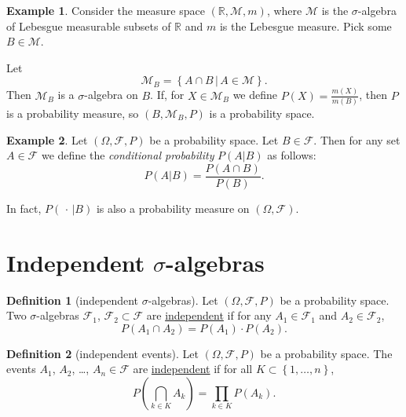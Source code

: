 \documentclass[a4paper]{scrartcl}
\newcommand{\R}{\mathbb{R}}
\newcommand{\defn}[1]{\ul{#1}}
\theoremstyle{definition}
\newtheorem{definition}{Definition}[section]
\newtheorem{example}{Example}[section]
\theoremstyle{plain}
\theoremstyle{remark}
\begin{document}
\begin{example}
  Consider the measure space $(\R, \mathcal{M}, m)$, where $\mathcal{M}$ is the $\sigma$-algebra of Lebesgue measurable subsets of $\R$ and $m$ is the Lebesgue measure. Pick some $B \in \mathcal{M}$.

  Let
  \begin{equation*}
    \mathcal{M}_{B} = \left\{ A \cap B\,\big|\, A \in \mathcal{M} \right\}.
  \end{equation*}
  Then $\mathcal{M}_{B}$ is a $\sigma$-algebra on $B$. If, for $X \in \mathcal{M}_{B}$ we define $P(X) = \frac{m(X)}{m(B)}$, then $P$ is a probability measure, so $(B, \mathcal{M}_{B}, P)$ is a probability space.
\end{example}

\begin{example}
  Let $(\Omega, \mathcal{F}, P)$ be a probability space. Let $B \in \mathcal{F}$. Then for any set $A \in \mathcal{F}$ we define the \emph{conditional probability} $P(A | B)$ as follows:
  \begin{equation*}
    P(A | B) = \frac{P(A \cap B)}{P(B)}.
  \end{equation*}

  In fact, $P(\,\cdot\,|B)$ is also a probability measure on $(\Omega, \mathcal{F})$.
\end{example}

\section{Independent \texorpdfstring{$\sigma$}{Lg}-algebras}

\begin{definition}[independent $\sigma$-algebras]
  \label{def:independentsigmaalgebra}
  Let $(\Omega, \mathcal{F}, P)$ be a probability space. Two $\sigma$-algebras $\mathcal{F}_{1}$, $\mathcal{F}_{2} \subset \mathcal{F}$ are \defn{independent} if for any $A_{1} \in \mathcal{F}_{1}$ and $A_{2} \in \mathcal{F}_{2}$,
  \begin{equation*}
    P(A_{1} \cap A_{2}) = P(A_{1}) \cdot P(A_{2}).
  \end{equation*}
\end{definition}

\begin{definition}[independent events]
  \label{def:independentevents}
  Let $(\Omega, \mathcal{F}, P)$ be a probability space. The events $A_{1}$, $A_{2}$, \dots, $A_{n} \in \mathcal{F}$ are \defn{independent} if for all $K \subset \left\{ 1,\ldots, n \right\}$,
  \begin{equation*}
    P\left( \bigcap_{k \in K} A_{k} \right) = \prod_{k \in K} P(A_{k}).
  \end{equation*}
\end{definition}
\end{document}
